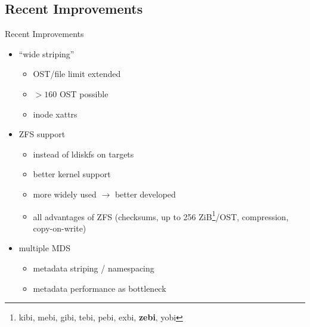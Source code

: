 \subsection{Recent Improvements}
\begin{frame}{Recent Improvements}
    \begin{itemize}
        \item ``wide striping''
            \begin{itemize}
                \item OST/file limit extended
                \item $> 160$ OST possible
                \item inode xattrs
            \end{itemize}
        \item ZFS support
            \begin{itemize}
                \item instead of ldiskfs on targets
                \item better kernel support
                \item more widely used $\rightarrow$ better developed
                \item all advantages of ZFS (checksums, up to 256 ZiB\footnote{kibi, mebi, gibi, tebi, pebi, exbi, \textbf{zebi}, yobi}/OST, compression, copy-on-write) \cite{zfs}
            \end{itemize}
        \item multiple MDS
            \begin{itemize}
                \item metadata striping / namespacing
                \item metadata performance as bottleneck
            \end{itemize}
    \end{itemize}
\end{frame}

